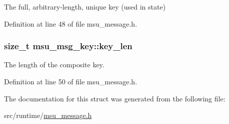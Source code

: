 The full, arbitrary-\/length, unique key (used in state) 



Definition at line 48 of file msu\-\_\-message.\-h.

\hypertarget{structmsu__msg__key_ac144c1faa26d9e6701acb2ef3282e7d5}{
\subsubsection[{key\-\_\-len}]{\setlength{\rightskip}{0pt plus 5cm}size\-\_\-t msu\-\_\-msg\-\_\-key\-::key\-\_\-len}}\label{structmsu__msg__key_ac144c1faa26d9e6701acb2ef3282e7d5}


The length of the composite key. 



Definition at line 50 of file msu\-\_\-message.\-h.



The documentation for this struct was generated from the following file\-:\begin{DoxyCompactItemize}
\item 
src/runtime/\hyperlink{msu__message_8h}{msu\-\_\-message.\-h}\end{DoxyCompactItemize}

